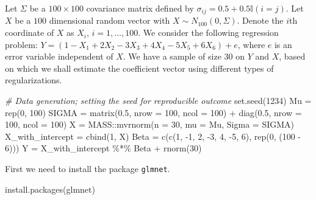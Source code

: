 \documentclass[
]{book}
\newenvironment{Shaded}{\begin{snugshade}}{\end{snugshade}}
\newcommand{\AttributeTok}[1]{\textcolor[rgb]{0.77,0.63,0.00}{#1}}
\newcommand{\CommentTok}[1]{\textcolor[rgb]{0.56,0.35,0.01}{\textit{#1}}}
\newcommand{\DecValTok}[1]{\textcolor[rgb]{0.00,0.00,0.81}{#1}}
\newcommand{\FloatTok}[1]{\textcolor[rgb]{0.00,0.00,0.81}{#1}}
\newcommand{\FunctionTok}[1]{\textcolor[rgb]{0.00,0.00,0.00}{#1}}
\newcommand{\NormalTok}[1]{#1}
\newcommand{\OtherTok}[1]{\textcolor[rgb]{0.56,0.35,0.01}{#1}}
\newcommand{\SpecialCharTok}[1]{\textcolor[rgb]{0.00,0.00,0.00}{#1}}
\newcommand{\StringTok}[1]{\textcolor[rgb]{0.31,0.60,0.02}{#1}}
\begin{document}
Let \(\Sigma\) be a \(100 \times 100\) covariance matrix defined by \(\sigma_{i j} = 0.5 + 0.5 \mathbb{I}(i = j)\). Let \(X\) be a \(100\) dimensional random vector with \(X \sim N_{100}( 0, \Sigma )\). Denote the \(i\)th coordinate of \(X\) as \(X_i\), \(i = 1, \ldots, 100\). We consider the following regression problem: \(Y = (1 - X_1 + 2 X_2 - 3 X_3 + 4 X_4 - 5 X_5 + 6 X_6) + e\), where \(e\) is an error variable independent of \(X\). We have a sample of size \(30\) on \(Y\) and \(X\), based on which we shall estimate the coefficient vector using different types of regularizations.

\begin{Shaded}
\begin{Highlighting}[]
\CommentTok{\# Data generation; setting the seed for reproducible outcome}
\FunctionTok{set.seed}\NormalTok{(}\DecValTok{1234}\NormalTok{)}
\NormalTok{Mu }\OtherTok{=} \FunctionTok{rep}\NormalTok{(}\DecValTok{0}\NormalTok{, }\DecValTok{100}\NormalTok{)}
\NormalTok{SIGMA }\OtherTok{=} \FunctionTok{matrix}\NormalTok{(}\FloatTok{0.5}\NormalTok{, }\AttributeTok{nrow =} \DecValTok{100}\NormalTok{, }\AttributeTok{ncol =} \DecValTok{100}\NormalTok{) }\SpecialCharTok{+}
  \FunctionTok{diag}\NormalTok{(}\FloatTok{0.5}\NormalTok{, }\AttributeTok{nrow =} \DecValTok{100}\NormalTok{, }\AttributeTok{ncol =} \DecValTok{100}\NormalTok{)}
\NormalTok{X }\OtherTok{=}\NormalTok{ MASS}\SpecialCharTok{::}\FunctionTok{mvrnorm}\NormalTok{(}\AttributeTok{n =} \DecValTok{30}\NormalTok{, }\AttributeTok{mu =}\NormalTok{ Mu, }\AttributeTok{Sigma =}\NormalTok{ SIGMA)}
\NormalTok{X\_with\_intercept }\OtherTok{=} \FunctionTok{cbind}\NormalTok{(}\DecValTok{1}\NormalTok{, X)}
\NormalTok{Beta }\OtherTok{=} \FunctionTok{c}\NormalTok{(}\FunctionTok{c}\NormalTok{(}\DecValTok{1}\NormalTok{, }\SpecialCharTok{{-}}\DecValTok{1}\NormalTok{, }\DecValTok{2}\NormalTok{, }\SpecialCharTok{{-}}\DecValTok{3}\NormalTok{, }\DecValTok{4}\NormalTok{, }\SpecialCharTok{{-}}\DecValTok{5}\NormalTok{, }\DecValTok{6}\NormalTok{), }\FunctionTok{rep}\NormalTok{(}\DecValTok{0}\NormalTok{, (}\DecValTok{100} \SpecialCharTok{{-}} \DecValTok{6}\NormalTok{)))}
\NormalTok{Y }\OtherTok{=}\NormalTok{ X\_with\_intercept }\SpecialCharTok{\%*\%}\NormalTok{ Beta }\SpecialCharTok{+} \FunctionTok{rnorm}\NormalTok{(}\DecValTok{30}\NormalTok{)}
\end{Highlighting}
\end{Shaded}

First we need to install the package \texttt{glmnet}.

\begin{Shaded}
\begin{Highlighting}[]
\FunctionTok{install.packages}\NormalTok{(}\StringTok{\textquotesingle{}glmnet\textquotesingle{}}\NormalTok{)}
\end{Highlighting}
\end{Shaded}
\end{document}
